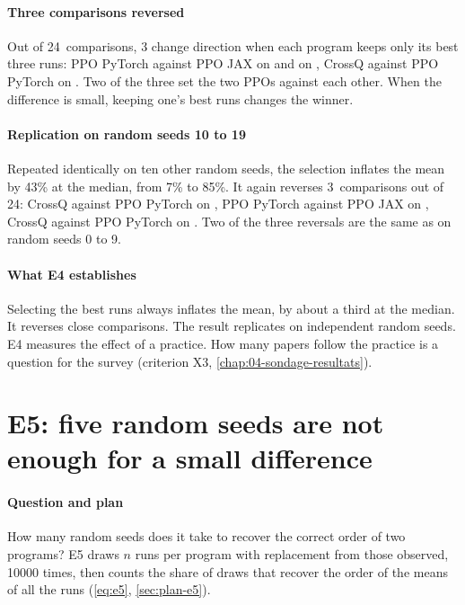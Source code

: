 
\paragraph{Three comparisons reversed}
Out of 24~comparisons, 3 change direction when each program keeps only its best three runs: PPO PyTorch
against PPO JAX on  and on , CrossQ against PPO PyTorch on . Two
of the three set the two PPOs against each other. When the difference is small, keeping one's best runs
changes the winner.


\paragraph{Replication on random seeds 10 to 19}
Repeated identically on ten other random seeds, the selection inflates the mean by 43\% at the median, from
7\% to 85\%. It again reverses 3~comparisons out of 24: CrossQ against PPO PyTorch on , PPO
PyTorch against PPO JAX on , CrossQ against PPO PyTorch on . Two of the three
reversals are the same as on random seeds 0 to 9.

\paragraph{What E4 establishes}
Selecting the best runs always inflates the mean, by about a third at the median. It reverses close
comparisons. The result replicates on independent random seeds. E4 measures the effect of a practice. How many
papers follow the practice is a question for the survey (criterion X3, \cref{chap:04-sondage-resultats}).

\section{E5: five random seeds are not enough for a small difference}\label{sec:e5}

\paragraph{Question and plan}
How many random seeds does it take to recover the correct order of two programs? E5 draws $n$ runs per program
with replacement from those observed, \num{10000} times, then counts the share of draws that recover the order
of the means of all the runs (\cref{eq:e5}, \cref{sec:plan-e5}).

